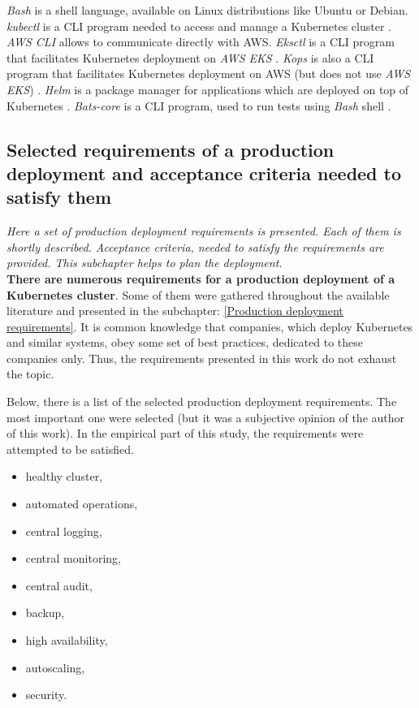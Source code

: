 \textit{Bash} is a shell language, available on Linux distributions like Ubuntu or Debian. \textit{kubectl} is a CLI program needed to access and manage a Kubernetes cluster \cite{kubectl}. \textit{AWS CLI} allows to communicate directly with AWS. \textit{Eksctl} is a CLI program that facilitates Kubernetes deployment on \textit{AWS EKS} \cite{eksctl}. \textit{Kops} is also a CLI program that facilitates Kubernetes deployment on AWS (but does not use \textit{AWS EKS}) \cite{online-kops}. \textit{Helm} is a package manager for applications which are deployed on top of Kubernetes \cite{helm}. \textit{Bats-core} is a CLI program, used to run tests using \textit{Bash} shell \cite{bats-core}.

\subsection{Selected requirements of a production deployment and acceptance criteria needed to satisfy them}
\textit{Here a set of production deployment requirements is presented. Each of them is shortly described. Acceptance criteria, needed to satisfy the requirements are provided. This subchapter helps to plan the deployment.}
\\

\textbf{There are numerous requirements for a production deployment of a Kubernetes cluster}. Some of them were gathered throughout the available literature and presented in the subchapter: \ref{Production deployment requirements}. It is common knowledge that companies, which deploy Kubernetes and similar systems, obey some set of best practices, dedicated to these companies only. Thus, the requirements presented in this work do not exhaust the topic.

Below, there is a list of the selected production deployment requirements. The most important one were selected (but it was a subjective opinion of the author of this work). In the empirical part of this study, the requirements were  attempted to be satisfied.
\begin{itemize}
\item healthy cluster,
\item automated operations,
\item central logging,
\item central monitoring,
\item central audit,
\item backup,
\item high availability,
\item autoscaling,
\item security.
\end{itemize}

